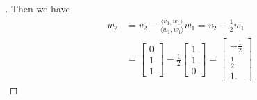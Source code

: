 \documentclass[11pt]{article}
\begin{document}
\begin{enumerate}
\begin{proof}[\unskip\nopunct]
            Then we have
            \begin{align*}
                w_2 &= v_2 - \frac{\langle v_3, w_1 \rangle}{\langle w_1, w_1 \rangle} w_1 = v_2 - \frac{1}{2} w_1 \\
                    &= \begin{bmatrix}
                        0 \\ 1 \\ 1
                    \end{bmatrix} - \frac{1}{2} \begin{bmatrix}
                        1 \\ 1 \\ 0
                    \end{bmatrix} = \begin{bmatrix}
                        -\frac{1}{2} \\ \frac{1}{2} \\ 1.
                    \end{bmatrix}
            \end{align*}


\end{proof}
\end{enumerate}
\end{document}
